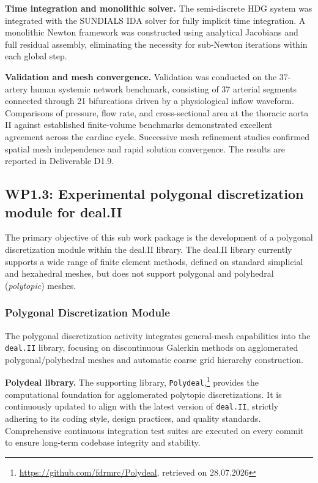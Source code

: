 \documentclass[a4paper,12pt, numbers]{article}
\newcommand{\dealii}{\texttt{deal.II}}
\begin{document}
\noindent\textbf{Time integration and monolithic solver.}
The semi-discrete HDG system was integrated with the \textsc{SUNDIALS} IDA solver for fully implicit time integration. A monolithic Newton framework was constructed using analytical Jacobians and full residual assembly, eliminating the necessity for sub-Newton iterations within each global step.

\noindent\textbf{Validation and mesh convergence.}
Validation was conducted on the 37-artery human systemic network benchmark, consisting of 37 arterial segments connected through 21 bifurcations driven by a physiological inflow waveform. Comparisons of pressure, flow rate, and cross-sectional area at the thoracic aorta II against established finite-volume benchmarks demonstrated excellent agreement across the cardiac cycle. Successive mesh refinement studies confirmed spatial mesh independence and rapid solution convergence. The results are reported in Deliverable D1.9.


\subsection{WP1.3: Experimental polygonal discretization module for deal.II} %
The primary objective of this sub work package is the development of a polygonal
discretization module within the deal.II library. The deal.II library currently
supports a wide range of finite element methods, defined on standard simplicial
and hexahedral meshes, but does not support polygonal and polyhedral (\emph{polytopic}) meshes.

\subsubsection*{Polygonal Discretization Module}

\noindent The polygonal discretization activity integrates general-mesh capabilities into the \dealii{} library, focusing on discontinuous Galerkin methods on agglomerated polygonal/polyhedral meshes and automatic coarse grid hierarchy construction.

\noindent\textbf{Polydeal library.}
The supporting library, \texttt{Polydeal},\footnote{\url{https://github.com/fdrmrc/Polydeal}, retrieved on 28.07.2026} provides the computational foundation for agglomerated polytopic discretizations. It is continuously updated to align with the latest version of \dealii{}, strictly adhering to its coding style, design practices, and quality standards. Comprehensive continuous integration test suites are executed on every commit to ensure long-term codebase integrity and stability.
\end{document}
